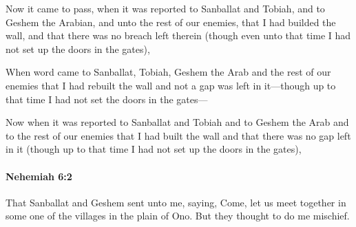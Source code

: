 			\begin{versebox}
					\item[BHS] 
					\item[LXX] 
					\item[ASV] Now it came to pass, when it was reported to Sanballat and Tobiah, and to Geshem the Arabian, and unto the rest of our enemies, that I had builded the wall, and that there was no breach left therein (though even unto that time I had not set up the doors in the gates),
					\item[NIV] When word came to Sanballat, Tobiah, Geshem the Arab and the rest of our enemies that I had rebuilt the wall and not a gap was left in it—though up to that time I had not set the doors in the gates—
					\item[NRSV] Now when it was reported to Sanballat and Tobiah and to Geshem the Arab and to the rest of our enemies that I had built the wall and that there was no gap left in it (though up to that time I had not set up the doors in the gates),
			\end{versebox}

		\paragraph{Nehemiah 6:2} %
			\label{NEHEMIAH-6-2}

			That Sanballat and Geshem sent unto me, saying, Come, let us meet together in some one of the villages in the plain of Ono. But they thought to do me mischief.


